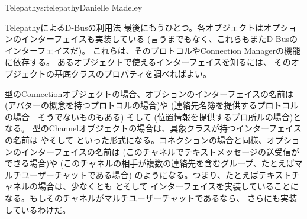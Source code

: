 \begin{aosachapter}{Telepathy}{s:telepathy}{Danielle Madeley}
\begin{aosasect1}{TelepathyによるD-Busの利用法}
最後にもうひとつ。各オブジェクトはオプションのインターフェイスも実装している
(言うまでもなく、これらもまたD-Busのインターフェイスだ)。
これらは、そのプロトコルやConnection Managerの機能に依存する。
あるオブジェクトで使えるインターフェイスを知るには、
そのオブジェクトの基底クラスのプロパティを調べればよい。

型のConnectionオブジェクトの場合、オプションのインターフェイスの名前は
 (アバターの概念を持つプロトコルの場合)や
 (連絡先名簿を提供するプロトコルの場合---そうでないものもある)
そして (位置情報を提供するプロ所ルの場合)となる。
型のChannelオブジェクトの場合は、具象クラスが持つインターフェイスの名前は
やそして
といった形式になる。コネクションの場合と同様、オプションのインターフェイスの名前は
 (このチャネルでテキストメッセージの送受信ができる場合)や
 (このチャネルの相手が複数の連絡先を含むグループ、たとえばマルチユーザーチャットである場合)
のようになる。つまり、たとえばテキストチャネルの場合は、少なくとも
とそして
インターフェイスを実装していることになる。もしそのチャネルがマルチユーザーチャットであるなら、
さらにも実装しているわけだ。


\end{aosasect1}
\end{aosachapter}

